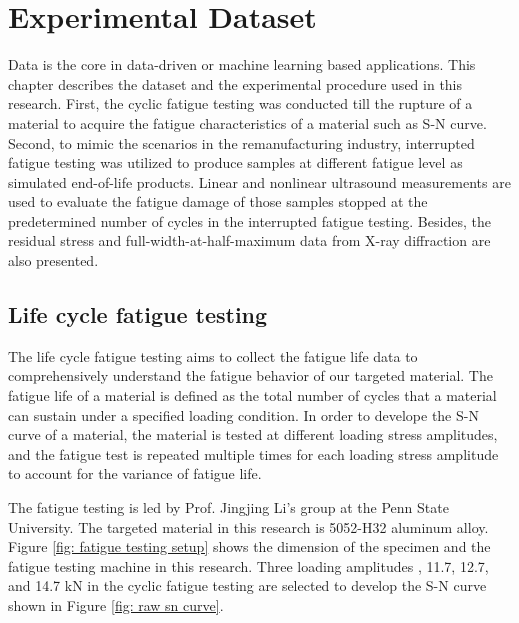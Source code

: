 \chapter{Experimental Dataset}
Data is the core in data-driven or machine learning based applications. This chapter describes the dataset and the experimental procedure used in this research. First, the cyclic fatigue testing was conducted till the rupture of a material to acquire the fatigue characteristics of a material such as S-N curve. Second, to mimic the scenarios in the remanufacturing industry, interrupted fatigue testing was utilized to produce samples at different fatigue level as simulated end-of-life products. Linear and nonlinear ultrasound measurements are used to evaluate the fatigue damage of those samples stopped at the predetermined number of cycles in the interrupted fatigue testing. Besides, the residual stress and full-width-at-half-maximum data from X-ray diffraction are also presented.

\section{Life cycle fatigue testing}
The life cycle fatigue testing aims to collect the fatigue life data to comprehensively understand the fatigue behavior of our targeted material. The fatigue life of a material is defined as the total number of cycles that a material can sustain under a specified loading condition. In order to develope the S-N curve of a material, the material is tested at different loading stress amplitudes, and the fatigue test is repeated multiple times for each loading stress amplitude to account for the variance of fatigue life.

The fatigue testing is led by Prof. Jingjing Li's group at the Penn State University. The targeted material in this research is 5052-H32 aluminum alloy. Figure \ref{fig: fatigue testing setup} shows the dimension of the specimen and the fatigue testing machine in this research. Three loading amplitudes , 11.7, 12.7, and 14.7 kN in the cyclic fatigue testing are selected to develop the S-N curve shown in Figure \ref{fig: raw sn curve}. 

